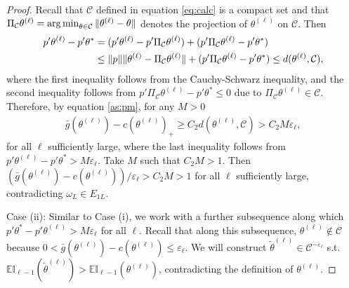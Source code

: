 \documentclass[letterpaper,11pt]{article}
\theoremstyle{myplain}
\theoremstyle{mydefinition}
\theoremstyle{myremark}
\def\argmin{\mathop{\rm arg\,min}}
\newcommand{\cC}{\mathcal{C}}
\numberwithin{equation}{section}
\numberwithin{figure}{section}
\begin{document}
\begin{appendix}
\begin{proof}
Recall that $\cC$ defined in equation \eqref{eq:calc} is a compact set and that $\Pi_{\mathcal C}\theta^{(\ell)}=\argmin_{\theta\in\mathcal C}\|\theta^{(\ell)}-\theta\|$ denotes the projection of $\theta^{(\ell)}$ on $\mathcal C$. 
Then
\begin{align}
 p'\theta^{(\ell)}-p'\theta^*&= (p'\theta^{(\ell)}-p'\Pi_{\mathcal C}\theta^{(\ell)})+(p'\Pi_{\mathcal C}\theta^{(\ell)}-p'\theta^*)\notag\\
&\le \|p\|\|\theta^{(\ell)}-\Pi_{\mathcal C}\theta^{(\ell)}\|+(p'\Pi_{\mathcal C}\theta^{(\ell)}-p'\theta^*)\le d(\theta^{(\ell)},\mathcal C)
,\label{eq:star_ell-1}
\end{align}
where the first inequality follows from the Cauchy-Schwarz inequality, and the second inequality follows from $p'\Pi_{\mathcal C}\theta^{(\ell)}-p'\theta^*\le 0$ due to $\Pi_{\mathcal C}\theta^{(\ell)} \in \mathcal C$.
Therefore, by equation \eqref{as:pm}, for any $M>0$
\begin{align}
\bar{g}(\theta^{(\ell)})-c(\theta^{(\ell)})_+\ge C_2d(\theta^{(\ell)},\mathcal C)> C_2M\varepsilon_\ell,\label{eq:star_ell0}
\end{align}
for all $\ell$ sufficiently large, where the last inequality follows from $p'\theta^{(\ell)}-p'\theta^*>M\varepsilon_\ell$. Take $M$ such that $C_2M>1$. Then $(\bar g(\theta^{(\ell)})-c(\theta^{(\ell)}))/\varepsilon_\ell>C_2M>1$ 
for all $\ell$ sufficiently large, contradicting $\omega_L\in E_{1L}$.

\bigskip
\noindent
Case (ii): Similar to Case (i), we work with a further subsequence along which $p'\theta^*-p'\theta^{(\ell)}>M\varepsilon_\ell$ for all $\ell$. Recall that along this subsequence, $\theta^{(\ell)} \notin \mathcal C$ because $0<\bar g(\theta^{(\ell)})-c(\theta^{(\ell)})\le \varepsilon_\ell$. We will construct $\tilde\theta^{(\ell)}\in\mathcal C^{-\varepsilon_\ell}$ s.t. $\mathbb{EI}_{\ell-1}(\tilde\theta^{(\ell)})>\mathbb{EI}_{\ell-1}(\theta^{(\ell)})$, contradicting the definition of $\theta^{(\ell)}$.


\end{proof}
\end{appendix}
\end{document}
